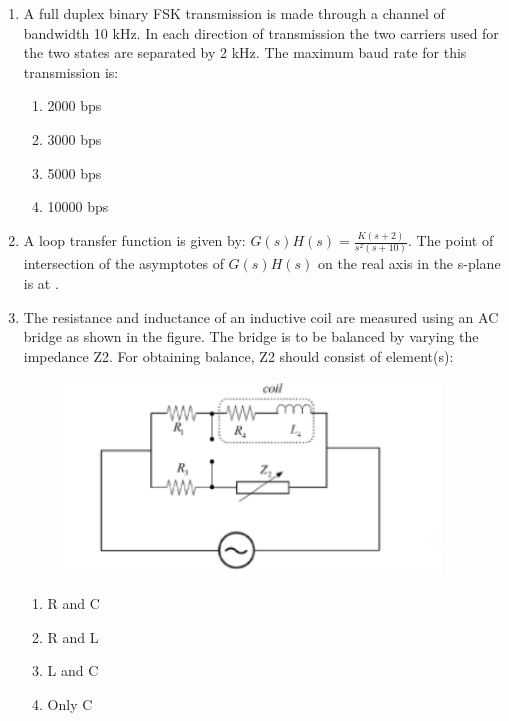 \documentclass[journal,12pt,onecolumn]{IEEEtran}
\theoremstyle{remark}
\begin{document}
\begin{enumerate}
    \item A full duplex binary FSK transmission is made through a channel of bandwidth 10 kHz. In each direction of transmission the two carriers used for the two states are separated by 2 kHz. The maximum baud rate for this transmission is:
    \begin{multicols}{4}
        \begin{enumerate}
            \item 2000 bps
            \item 3000 bps
            \item 5000 bps
            \item 10000 bps
        \end{enumerate}
    \end{multicols}
    
    \item A loop transfer function is given by: $G(s)H(s) = \frac{K(s+2)}{s^2(s+10)}$. The point of intersection of the asymptotes of $G(s)H(s)$ on the real axis in the s-plane is at \underline{\hspace{2cm}}.
    
    \item The resistance and inductance of an inductive coil are measured using an AC bridge as shown in the figure. The bridge is to be balanced by varying the impedance Z2. For obtaining balance, Z2 should consist of element(s):
    \begin{figure}[H]
        \centering
        \includegraphics[width=0.6\columnwidth]{q22}
        \caption*{}
        \label{fig:placeholder}
    \end{figure}
    \begin{multicols}{2}
        \begin{enumerate}
            \item R and C
            \item R and L
            \item L and C
            \item Only C
        \end{enumerate}
    \end{multicols}
    

\end{enumerate}
\end{document}
